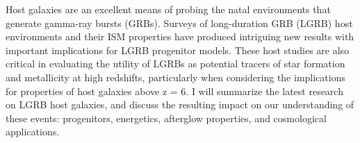 


\bigskip



\bigskip

\noindent Host galaxies are an excellent means of probing the natal environments that generate gamma-ray bursts (GRBs). Surveys of long-duration GRB (LGRB) host environments and their ISM properties have produced intriguing new results with important implications for LGRB progenitor models. These host studies are also critical in evaluating the utility of LGRBs as potential tracers of star formation and metallicity at high redshifts, particularly when considering the implications for properties of host galaxies above z = 6. I will summarize the latest research on LGRB host galaxies, and discuss the resulting impact on our understanding of these events: progenitors, energetics, afterglow properties, and cosmological applications.

